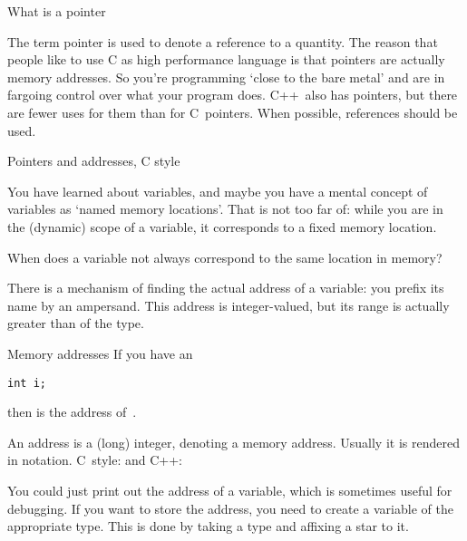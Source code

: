 
 {What is a pointer}

The term pointer is used to denote a reference to a quantity. The
reason that people like to use C as high performance language is
that pointers are actually memory addresses. So you're programming
`close to the bare metal' and are in fargoing control over what your program
does. C++~also has pointers, but there are fewer uses for them than
for C~pointers. When possible, references should be used.

 {Pointers and addresses, C style}
\label{sec:cderef}

You have learned about variables, and maybe you have a mental concept
of variables as `named memory locations'. That is not too far of:
while you are in the (dynamic) scope of a variable, it corresponds to
a fixed memory location.

\begin{exercise}
  \label{ex:varmemscope}
  When does a variable not always correspond to the same location in
  memory?
\end{exercise}

There is a mechanism of finding the actual address of a variable: you
prefix its name by an ampersand. 
This address is integer-valued, but
its range is actually greater than of the  type.

\begin{block}{Memory addresses}
  \label{sl:ampersand}
  If you have an
\begin{verbatim}
int i;
\end{verbatim}
then  is the address of~.

An address is a (long) integer, denoting a memory address. Usually it
is rendered in  notation. C~style:
%
%
and C++:
%
\end{block}

You could just print out the address of a variable, which is sometimes
useful for debugging. If you want to store the address, you need to
create a variable of the appropriate type. This is done by taking a
type and affixing a star to it.


